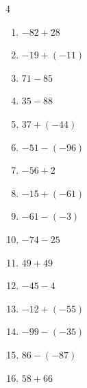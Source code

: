 \begin{multicols}{4}
\begin{enumerate}
        \phantom{$=-6$}

  \item $-82+28$

        \phantom{$=-54$}

  \item $-19+(-11)$

        \phantom{$=-30$}

\columnbreak %

  \item $71-85$

        \phantom{$=-14$}

  \item $35-88$

        \phantom{$=-53$}

  \item $37+(-44)$

        \phantom{$=-7$}

  \item $-51-(-96)$

        \phantom{$=45$}

  \item $-56+2$

        \phantom{$=-54$}

  \item $-15+(-61)$

        \phantom{$=-76$}

  \item $-61-(-3)$

        \phantom{$=-58$}

  \item $-74-25$

        \phantom{$=-99$}

  \item $49+49$

        \phantom{$=98$}

  \item $-45-4$

        \phantom{$=-49$}

  \item $-12+(-55)$

        \phantom{$=-67$}

  \item $-99-(-35)$

        \phantom{$=-64$}

  \item $86-(-87)$

        \phantom{$=173$}

  \item $58+66$


\end{enumerate}
\end{multicols}
